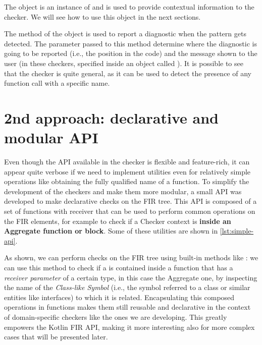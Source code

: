 \documentclass[12pt,a4paper,openright,twoside]{book}
\begin{document}


The  object is an instance of  and is 
used to provide contextual information to the checker. We will see how to 
use this object in the next sections.

The  method of the  object is used to report a
diagnostic when the pattern gets detected. The parameter passed to this method
determine where the diagnostic is going to be reported (i.e., the position in
the code) and the message shown to the user (in these checkers, specified inside
an object called ). It is possible to see that the 
checker is quite general, as it can be used to detect the presence of any 
function call with a specific name.

\section{2nd approach: declarative and modular API}

Even though the API available in the checker is flexible and feature-rich, it
can appear quite verbose if we need to implement utilities even for relatively
simple operations like obtaining the fully qualified name of a function. To
simplify the development of the checkers and make them more modular, a small API
was developed to make declarative checks on the \ac{FIR} tree. This API is
composed of a set of functions with receiver that can be used to perform common
operations on the \ac{FIR} elements, for example to check if a Checker context
is \textbf{inside an Aggregate function or block}. Some of these utilities are
shown in \cref{lst:simple-api}.



As shown, we can perform checks on the \ac{FIR} tree using built-in methods like
: we can use this method to check if a
 is contained inside a function that has a \emph{receiver
parameter} of a certain type, in this case the Aggregate one, by
inspecting the name of the \emph{Class-like Symbol} (i.e., the symbol referred
to a class or similar entities like interfaces) to which it is related. 
%
Encapsulating this composed operations in functions makes them still reusable
and declarative in the context of domain-specific checkers like the ones we are
developing. This greatly empowers the Kotlin \ac{FIR} API, making it more
interesting also for more complex cases that will be presented later.
\end{document}
